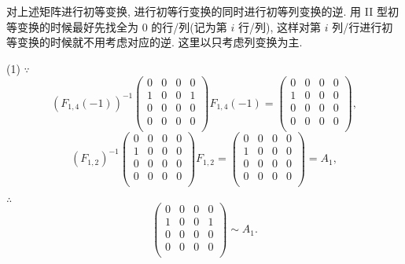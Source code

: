 \documentclass{ctexart}
\begin{document}
\begin{solution}
    对上述矩阵进行初等变换, 进行初等行变换的同时进行初等列变换的逆. 用 II 型初等变换的时候最好先找全为 $0$ 的行/列(记为第 $i$ 行/列), 这样对第 $i$ 列/行进行初等变换的时候就不用考虑对应的逆. 这里以只考虑列变换为主.
    
    (1) $\because$
    \[(F_{1,4}(-1))^{-1}\begin{pmatrix}
        0 & 0 & 0 & 0 \\
        1 & 0 & 0 & 1 \\
        0 & 0 & 0 & 0 \\
        0 & 0 & 0 & 0 \\
    \end{pmatrix}F_{1,4}(-1)=\begin{pmatrix}
        0 & 0 & 0 & 0 \\
        1 & 0 & 0 & 0 \\
        0 & 0 & 0 & 0 \\
        0 & 0 & 0 & 0 \\
    \end{pmatrix},\]
    \[(F_{1,2})^{-1}\begin{pmatrix}
        0 & 0 & 0 & 0 \\
        1 & 0 & 0 & 0 \\
        0 & 0 & 0 & 0 \\
        0 & 0 & 0 & 0 \\
    \end{pmatrix}F_{1,2}=\begin{pmatrix}
        0 & 0 & 0 & 0 \\
        1 & 0 & 0 & 0 \\
        0 & 0 & 0 & 0 \\
        0 & 0 & 0 & 0 \\
    \end{pmatrix}=A_1,\]

    $\therefore$
    \[\begin{pmatrix}
        0 & 0 & 0 & 0 \\
        1 & 0 & 0 & 1 \\
        0 & 0 & 0 & 0 \\
        0 & 0 & 0 & 0 \\
    \end{pmatrix}\sim A_1.\]


\end{solution}
\end{document}
